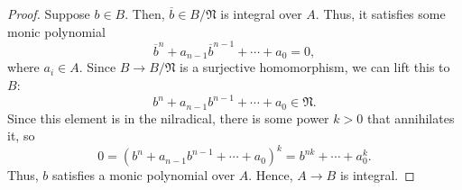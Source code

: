 \begin{proof}
Suppose $b \in B$. Then, $\overline{b} \in B/\mathfrak{N}$ is integral over $A$. Thus, it satisfies some monic polynomial
$$\overline{b}^n + a_{n-1}\overline{b}^{n-1} + \cdots + a_0 = 0,$$
where $a_i \in A$. Since $B \to B/\mathfrak{N}$ is a surjective homomorphism, we can lift this to $B$:
$$b^n + a_{n-1}b^{n-1} + \cdots + a_0 \in \mathfrak{N}.$$
Since this element is in the nilradical, there is some power $k > 0$ that annihilates it, so 
$$0 = (b^n + a_{n-1}b^{n-1} + \cdots + a_0)^k = b^{nk} + \cdots + a_0^k.$$
Thus, $b$ satisfies a monic polynomial over $A$. Hence, $A \to B$ is integral.
\end{proof}
